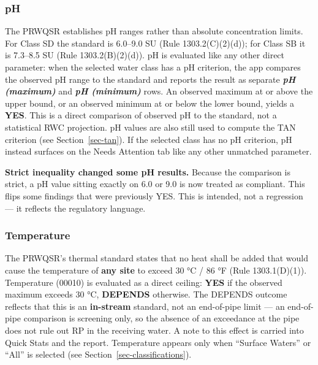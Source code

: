\documentclass[
  11pt,
  letterpaper,
  DIV=11,
  numbers=noendperiod]{scrartcl}
\begin{document}
\subsubsection{pH}\label{sec-ph}

The PRWQSR establishes pH ranges rather than absolute concentration
limits. For Class SD the standard is 6.0--9.0 SU (Rule 1303.2(C)(2)(d));
for Class SB it is 7.3--8.5 SU (Rule 1303.2(B)(2)(d)). pH is evaluated
like any other direct parameter: when the selected water class has a pH
criterion, the app compares the observed pH range to the standard and
reports the result as separate \textbf{\emph{pH (maximum)}} and
\textbf{\emph{pH (minimum)}} rows. An observed maximum at or above the
upper bound, or an observed minimum at or below the lower bound, yields
a \textbf{YES}. This is a direct comparison of observed pH to the
standard, not a statistical RWC projection. pH values are also still
used to compute the TAN criterion (see Section~\ref{sec-tan}). If the
selected class has no pH criterion, pH instead surfaces on the Needs
Attention tab like any other unmatched parameter.

\begin{tcolorbox}[enhanced jigsaw, arc=.35mm, bottomrule=.15mm, bottomtitle=1mm, breakable, colback=white, colbacktitle=quarto-callout-note-color!10!white, colframe=quarto-callout-note-color-frame, coltitle=black, left=2mm, leftrule=.75mm, opacityback=0, opacitybacktitle=0.6, rightrule=.15mm, title=\textcolor{quarto-callout-note-color}{\faInfo}\hspace{0.5em}{Note}, titlerule=0mm, toprule=.15mm, toptitle=1mm]

\textbf{Strict inequality changed some pH results.} Because the
comparison is strict, a pH value sitting exactly on 6.0 or 9.0 is now
treated as compliant. This flips some findings that were previously YES.
This is intended, not a regression --- it reflects the regulatory
language.

\end{tcolorbox}

\subsubsection{Temperature}\label{sec-temperature}

The PRWQSR's thermal standard states that no heat shall be added that
would cause the temperature of \textbf{any site} to exceed 30 °C / 86 °F
(Rule 1303.1(D)(1)). Temperature (00010) is evaluated as a direct
ceiling: \textbf{YES} if the observed maximum exceeds 30 °C,
\textbf{DEPENDS} otherwise. The DEPENDS outcome reflects that this is an
\textbf{in-stream} standard, not an end-of-pipe limit --- an end-of-pipe
comparison is screening only, so the absence of an exceedance at the
pipe does not rule out RP in the receiving water. A note to this effect
is carried into Quick Stats and the report. Temperature appears only
when ``Surface Waters'' or ``All'' is selected (see
Section~\ref{sec-classifications}).
\end{document}
